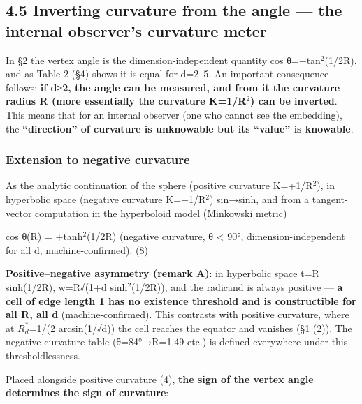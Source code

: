 \documentclass[
]{ltjsarticle}
\begin{document}
\subsection{4.5 Inverting curvature from the angle --- the internal
observer's curvature
meter}\label{inverting-curvature-from-the-angle-the-internal-observers-curvature-meter}

In §2 the vertex angle is the dimension-independent quantity cos
θ=−tan\(^{2}\)(1/2R), and as Table 2 (§4) shows it is equal for d=2--5.
An important consequence follows: \textbf{if d≥2, the angle can be
measured, and from it the curvature radius R (more essentially the
curvature K=1/R\(^{2}\)) can be inverted}. This means that for an
internal observer (one who cannot see the embedding), the
\textbf{``direction'' of curvature is unknowable but its ``value'' is
knowable}.

\subsubsection{Extension to negative
curvature}\label{extension-to-negative-curvature}

As the analytic continuation of the sphere (positive curvature
K=+1/R\(^{2}\)), in hyperbolic space (negative curvature K=−1/R\(^{2}\))
sin→sinh, and from a tangent-vector computation in the hyperboloid model
(Minkowski metric)

cos θ(R) = +tanh\(^{2}\)(1/2R) (negative curvature, θ \textless{} 90°,
dimension-independent for all d, machine-confirmed). (8)

\textbf{Positive--negative asymmetry (remark A)}: in hyperbolic space
t=R sinh(1/2R), w=R√(1+d sinh\(^{2}\)(1/2R)), and the radicand is always
positive --- \textbf{a cell of edge length 1 has no existence threshold
and is constructible for all R, all d} (machine-confirmed). This
contrasts with positive curvature, where at \(R^{*}_{d}\)=1/(2
arcsin(1/√d)) the cell reaches the equator and vanishes (§1 (2)). The
negative-curvature table (θ=84°→R=1.49 etc.) is defined everywhere under
this thresholdlessness.

Placed alongside positive curvature (4), \textbf{the sign of the vertex
angle determines the sign of curvature}:
\end{document}
